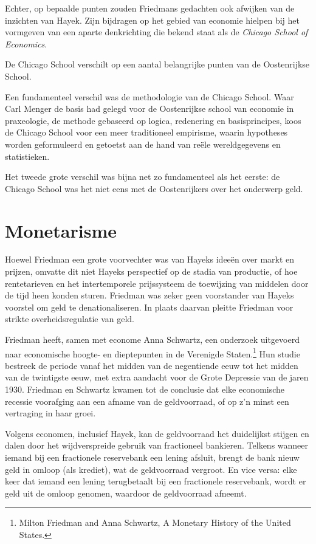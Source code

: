 \documentclass[
  a5paper,
  smalldemyvopaper,11pt,twoside,onecolumn,openright,extrafontsizes,
hidelinks]{memoir}
\begin{document}
Echter, op bepaalde punten zouden Friedmans gedachten ook afwijken van
de inzichten van Hayek. Zijn bijdragen op het gebied van economie
hielpen bij het vormgeven van een aparte denkrichting die bekend staat
als de \emph{Chicago School of Economics}.

De Chicago School verschilt op een aantal belangrijke punten van de
Oostenrijkse School.

Een fundamenteel verschil was de methodologie van de Chicago School.
Waar Carl Menger de basis had gelegd voor de Oostenrijkse school van
economie in praxeologie, de methode gebaseerd op logica, redenering en
basisprincipes, koos de Chicago School voor een meer traditioneel
empirisme, waarin hypotheses worden geformuleerd en getoetst aan de hand
van reële wereldgegevens en statistieken.

Het tweede grote verschil was bijna net zo fundamenteel als het eerste:
de Chicago School was het niet eens met de Oostenrijkers over het
onderwerp geld.

\section{Monetarisme}\label{monetarisme}

Hoewel Friedman een grote voorvechter was van Hayeks ideeën over markt
en prijzen, omvatte dit niet Hayeks perspectief op de stadia van
productie, of hoe rentetarieven en het intertemporele prijssysteem de
toewijzing van middelen door de tijd heen konden sturen. Friedman was
zeker geen voorstander van Hayeks voorstel om geld te denationaliseren.
In plaats daarvan pleitte Friedman voor strikte overheidsregulatie van
geld.

Friedman heeft, samen met econome Anna Schwartz, een onderzoek
uitgevoerd naar economische hoogte- en dieptepunten in de Verenigde
Staten.\footnote{Milton Friedman and Anna Schwartz, A Monetary History
  of the United States.} Hun studie bestreek de periode vanaf het midden
van de negentiende eeuw tot het midden van de twintigste eeuw, met extra
aandacht voor de Grote Depressie van de jaren 1930. Friedman en Schwartz
kwamen tot de conclusie dat elke economische recessie voorafging aan een
afname van de geldvoorraad, of op z'n minst een vertraging in haar
groei.

Volgens economen, inclusief Hayek, kan de geldvoorraad het duidelijkst
stijgen en dalen door het wijdverspreide gebruik van fractioneel
bankieren. Telkens wanneer iemand bij een fractionele reservebank een
lening afsluit, brengt de bank nieuw geld in omloop (als krediet), wat
de geldvoorraad vergroot. En vice versa: elke keer dat iemand een lening
terugbetaalt bij een fractionele reservebank, wordt er geld uit de
omloop genomen, waardoor de geldvoorraad afneemt.
\end{document}
